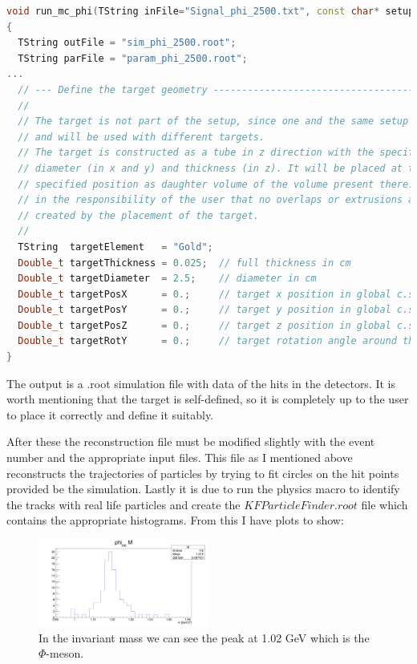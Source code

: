 \documentclass[a4paper,12pt]{article}
\begin{document}
\begin{lstlisting}[language=C++]
void run_mc_phi(TString inFile="Signal_phi_2500.txt", const char* setupName = "sis100_electron", Int_t nEvents = 2500)
{
  TString outFile = "sim_phi_2500.root";
  TString parFile = "param_phi_2500.root";
...
  // --- Define the target geometry -----------------------------------------
  //
  // The target is not part of the setup, since one and the same setup can
  // and will be used with different targets.
  // The target is constructed as a tube in z direction with the specified
  // diameter (in x and y) and thickness (in z). It will be placed at the
  // specified position as daughter volume of the volume present there. It is
  // in the responsibility of the user that no overlaps or extrusions are
  // created by the placement of the target.
  //
  TString  targetElement   = "Gold";
  Double_t targetThickness = 0.025;  // full thickness in cm
  Double_t targetDiameter  = 2.5;    // diameter in cm
  Double_t targetPosX      = 0.;     // target x position in global c.s. [cm]
  Double_t targetPosY      = 0.;     // target y position in global c.s. [cm]
  Double_t targetPosZ      = 0.;     // target z position in global c.s. [cm]
  Double_t targetRotY      = 0.;     // target rotation angle around the y axis [deg]
}
\end{lstlisting} 
\par The output is a .root simulation file with data of the hits in the detectors. It is worth mentioning that the target is self-defined, so it is completely up to the user to place it correctly and define it suitably.
\vspace{5mm}
\par After these the reconstruction file must be modified slightly with the event number and the appropriate input files. This file as I mentioned above reconstructs the trajectories of particles by trying to fit circles on the hit points provided be the simulation. Lastly it is due to run the physics macro to identify the tracks with real life particles and create the $KFParticleFinder.root$ file which contains the appropriate histograms. From this I have plots to show:
\begin{figure}[H]
	\centering
	\includegraphics[width=0.5\textwidth]{phiKK_2500phi.png}
	\caption{ In the invariant mass we can see the peak at 1.02 GeV which is the $\Phi$-meson. }
\end{figure}
\end{document}
